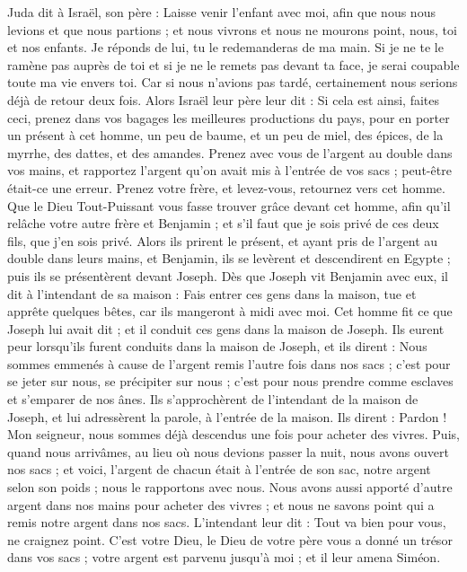 \begin{multicols}{2}
Juda dit à Israël, son père : Laisse venir l'enfant avec moi, afin que nous nous levions et que nous partions ; et nous vivrons et nous ne mourons point, nous, toi et nos enfants.
Je réponds de lui, tu le redemanderas de ma main. Si je ne te le ramène pas auprès de toi et si je ne le remets pas devant ta face, je serai coupable toute ma vie envers toi.
Car si nous n’avions pas tardé, certainement nous serions déjà de retour deux fois.
Alors Israël leur père leur dit : Si cela est ainsi, faites ceci, prenez dans vos bagages les meilleures productions du pays, pour en  porter un présent à cet homme, un peu de baume, et un peu de miel, des épices, de la myrrhe, des dattes, et des amandes.
Prenez avec vous de l'argent au double dans vos mains, et rapportez l’argent qu’on avait mis à l’entrée de vos sacs ; peut-être était-ce une erreur.
Prenez votre frère, et levez-vous, retournez vers cet homme.
Que le Dieu Tout-Puissant vous fasse trouver grâce devant cet homme, afin qu'il relâche votre autre frère et Benjamin ; et s'il faut que je sois privé de ces deux fils, que j'en sois privé.
Alors ils prirent le présent, et ayant pris de l'argent au double dans leurs mains, et Benjamin, ils se levèrent et descendirent en Egypte ; puis ils se présentèrent devant Joseph.
Dès que Joseph vit Benjamin avec eux, il dit à l’intendant de sa maison : Fais entrer ces gens dans la maison, tue et apprête quelques bêtes, car ils mangeront à midi avec moi.
Cet homme fit ce que Joseph lui avait dit ; et il conduit ces gens dans la maison de Joseph.
Ils eurent peur lorsqu’ils furent conduits dans la maison de Joseph, et ils dirent : Nous sommes emmenés à cause de l'argent remis l’autre fois dans nos sacs ; c’est pour se jeter sur nous, se précipiter sur nous ; c’est pour nous prendre comme esclaves et s’emparer de nos ânes.
Ils s’approchèrent de l’intendant de la maison de Joseph, et lui adressèrent la parole, à l’entrée de la maison.
Ils dirent : Pardon ! Mon seigneur, nous sommes déjà descendus une fois pour acheter des vivres.
Puis, quand nous arrivâmes, au lieu où nous devions passer la nuit, nous avons ouvert nos sacs ; et voici, l’argent de chacun était à l’entrée de son sac, notre argent selon son poids ;  nous le rapportons avec nous.
Nous avons aussi apporté d'autre argent dans nos mains pour acheter des vivres ; et nous ne savons point qui a remis notre argent dans nos sacs.
L’intendant leur dit : Tout va bien pour vous, ne craignez point. C’est votre Dieu, le Dieu de votre père vous a donné un trésor dans vos sacs ; votre argent est parvenu jusqu'à moi ; et il leur amena Siméon.

\end{multicols}
